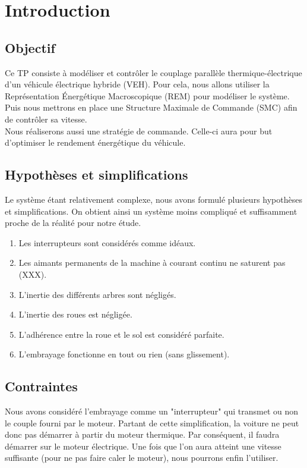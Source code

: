 \section{Introduction}

\subsection{Objectif}

	Ce TP consiste à modéliser et contrôler le couplage parallèle thermique-électrique d'un véhicule électrique hybride (VEH). Pour cela, nous allons utiliser la Représentation Énergétique Macroscopique (REM) pour modéliser le système. Puis nous mettrons en place une Structure Maximale de Commande (SMC) afin de contrôler sa vitesse.\\
	Nous réaliserons aussi une stratégie de commande. Celle-ci aura pour but d'optimiser le rendement énergétique du véhicule.

\subsection{Hypothèses et simplifications}

	Le système étant relativement complexe, nous avons formulé plusieurs hypothèses et simplifications. On obtient ainsi un système moins compliqué et suffisamment proche de la réalité pour notre étude. 

\begin{enumerate} 
\item Les interrupteurs sont considérés comme idéaux.
\item Les aimants permanents de la machine à courant continu ne saturent pas (XXX).
\item L'inertie des différents arbres sont négligés.
\item L'inertie des roues est négligée.
\item L'adhérence entre la roue et le sol est considéré parfaite. 
\item L'embrayage fonctionne en tout ou rien (sans glissement).
\end{enumerate}

\subsection{Contraintes}
	Nous avons considéré l'embrayage comme un "interrupteur" qui transmet ou non le couple fourni par le moteur. Partant de cette simplification, la voiture ne peut donc pas démarrer à partir du moteur thermique. Par conséquent, il faudra démarrer sur le moteur électrique. Une fois que l'on aura atteint une vitesse suffisante (pour ne pas faire caler le moteur), nous pourrons enfin l'utiliser.

